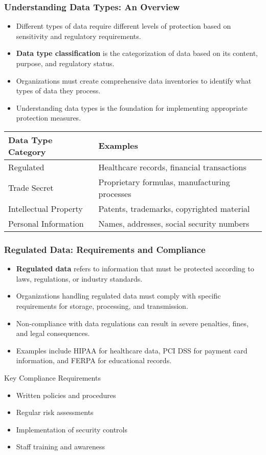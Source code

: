 \documentclass{beamer}
\begin{document}
\begin{frame}
\frametitle{Understanding Data Types: An Overview}
\begin{itemize}
\item Different types of data require different levels of protection based on sensitivity and regulatory requirements.
\item \textbf{Data type classification} is the categorization of data based on its content, purpose, and regulatory status.
\item Organizations must create comprehensive data inventories to identify what types of data they process.
\item Understanding data types is the foundation for implementing appropriate protection measures.
\end{itemize}

\begin{table}
\begin{tabular}{|l|l|}
\hline
\textbf{Data Type Category} & \textbf{Examples} \\
\hline
Regulated & Healthcare records, financial transactions \\
\hline
Trade Secret & Proprietary formulas, manufacturing processes \\
\hline
Intellectual Property & Patents, trademarks, copyrighted material \\
\hline
Personal Information & Names, addresses, social security numbers \\
\hline
\end{tabular}
\end{table}
\end{frame}

\begin{frame}
\frametitle{Regulated Data: Requirements and Compliance}
\begin{itemize}
\item \textbf{Regulated data} refers to information that must be protected according to laws, regulations, or industry standards.
\item Organizations handling regulated data must comply with specific requirements for storage, processing, and transmission.
\item Non-compliance with data regulations can result in severe penalties, fines, and legal consequences.
\item Examples include HIPAA for healthcare data, PCI DSS for payment card information, and FERPA for educational records.
\end{itemize}

\begin{block}{Key Compliance Requirements}
\begin{itemize}
\item Written policies and procedures
\item Regular risk assessments
\item Implementation of security controls
\item Staff training and awareness
\end{itemize}
\end{block}
\end{frame}
\end{document}
